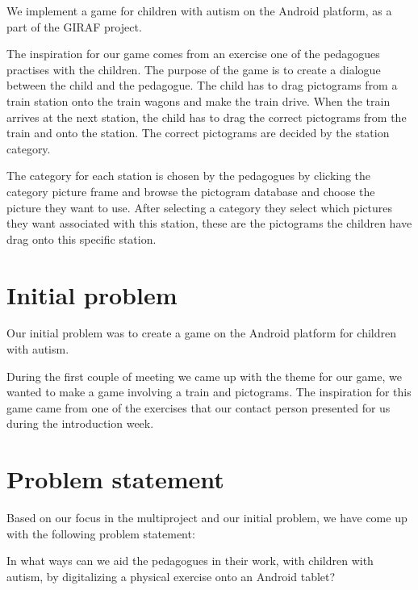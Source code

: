 We implement a game for children with autism on the Android platform, as a part of the GIRAF project.

The inspiration for our game comes from an exercise one of the pedagogues practises with the children. The purpose of the game is to create a dialogue between the child and the pedagogue. The child has to drag pictograms from a train station onto the train wagons and make the train drive. When the train arrives at the next station, the child has to drag the correct pictograms from the train and onto the station. The correct pictograms are decided by the station category.

The category for each station is chosen by the pedagogues by clicking the category picture frame and browse the pictogram database and choose the picture they want to use. After selecting a category they select which pictures they want associated with this station, these are the pictograms the children have drag onto this specific station.

\section{Initial problem}

Our initial problem was to create a game on the Android platform for children with autism. 

During the first couple of meeting we came up with the theme for our game, we wanted to make a game involving a train and pictograms. The inspiration for this game came from one of the exercises that our contact person presented for us during the introduction week.


\section{Problem statement}

Based on our focus in the multiproject and our initial problem, we have come up with the following problem statement:

In what ways can we aid the pedagogues in their work, with children with autism, by digitalizing a physical exercise onto an Android tablet?